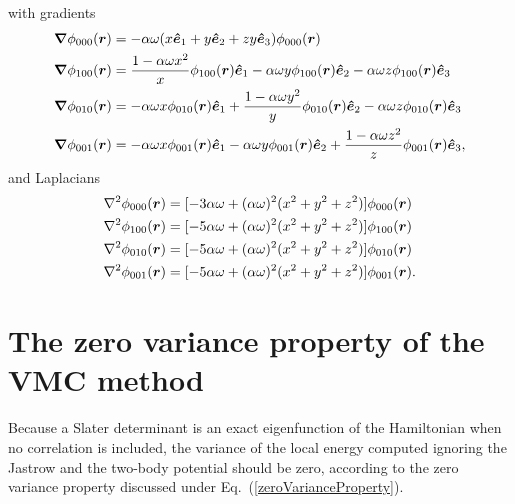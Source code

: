 with gradients
\begin{align}
 \boldsymbol{\nabla}\phi_{000}(\boldsymbol{r}) &= -\alpha \omega (x \mbox{\boldmath$\hat{e}$\unboldmath}_1 + y \mbox{\boldmath$\hat{e}$\unboldmath}_2 + zy \mbox{\boldmath$\hat{e}$\unboldmath}_3) \phi_{000}(\boldsymbol{r})\\
 \boldsymbol{\nabla}\phi_{100}(\boldsymbol{r}) &= \frac{1 - \alpha \omega x^2}{x} \phi_{100}(\boldsymbol{r}) \mbox{\boldmath$\hat{e}$\unboldmath}_1 - \alpha \omega y \phi_{100}(\boldsymbol{r}) \mbox{\boldmath$\hat{e}$\unboldmath}_2 - \alpha \omega z \phi_{100}(\boldsymbol{r}) \mbox{\boldmath$\hat{e}$\unboldmath}_3\\
 \boldsymbol{\nabla}\phi_{010}(\boldsymbol{r}) &= - \alpha \omega x \phi_{010}(\boldsymbol{r}) \mbox{\boldmath$\hat{e}$\unboldmath}_1 + \frac{1 - \alpha \omega y^2}{y} \phi_{010}(\boldsymbol{r}) \mbox{\boldmath$\hat{e}$\unboldmath}_2 - \alpha \omega z \phi_{010}(\boldsymbol{r}) \mbox{\boldmath$\hat{e}$\unboldmath}_3\\
 \boldsymbol{\nabla}\phi_{001}(\boldsymbol{r}) &= - \alpha \omega x \phi_{001}(\boldsymbol{r}) \mbox{\boldmath$\hat{e}$\unboldmath}_1 - \alpha \omega y \phi_{001}(\boldsymbol{r}) \mbox{\boldmath$\hat{e}$\unboldmath}_2 + \frac{1 - \alpha \omega z^2}{z} \phi_{001}(\boldsymbol{r}) \mbox{\boldmath$\hat{e}$\unboldmath}_3,
\end{align}
and Laplacians
\begin{align}
\nabla^2 \phi_{000}(\boldsymbol{r}) &= [-3 \alpha \omega + (\alpha \omega)^2 (x^2 + y^2 + z^2)] \phi_{000}(\boldsymbol{r})\\
\nabla^2 \phi_{100}(\boldsymbol{r}) &= [-5 \alpha \omega + (\alpha \omega)^2 (x^2 + y^2 + z^2)] \phi_{100}(\boldsymbol{r}) \\
\nabla^2 \phi_{010}(\boldsymbol{r}) &= [-5 \alpha \omega + (\alpha \omega)^2 (x^2 + y^2 + z^2)] \phi_{010}(\boldsymbol{r}) \\
\nabla^2 \phi_{001}(\boldsymbol{r}) &= [-5 \alpha \omega + (\alpha \omega)^2 (x^2 + y^2 + z^2)] \phi_{001}(\boldsymbol{r}).
\end{align}


\section{The zero variance property of the VMC method}\label{zeroVariancePrinciple}
Because a Slater determinant is an exact eigenfunction of the Hamiltonian when no correlation is included, the variance of the local energy computed ignoring the Jastrow and the two-body potential should be zero, according to the zero variance property discussed under Eq.~(\ref{zeroVarianceProperty}).


\clearemptydoublepage
